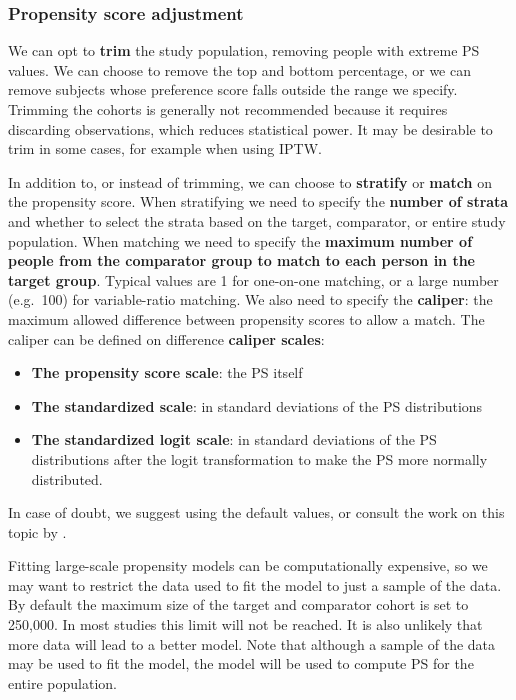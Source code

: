 \documentclass[11pt]{book}
\providecommand{\tightlist}{%
  \setlength{\itemsep}{0pt}\setlength{\parskip}{0pt}}
\theoremstyle{definition}
\theoremstyle{definition}
\theoremstyle{definition}
\theoremstyle{remark}
\begin{document}
\hypertarget{propensity-score-adjustment}{%
\subsubsection*{Propensity score adjustment}\label{propensity-score-adjustment}}

We can opt to \textbf{trim} the study population, removing people with extreme PS values. We can choose to remove the top and bottom percentage, or we can remove subjects whose preference score falls outside the range we specify. Trimming the cohorts is generally not recommended because it requires discarding observations, which reduces statistical power. It may be desirable to trim in some cases, for example when using IPTW. 

In addition to, or instead of trimming, we can choose to \textbf{stratify} or \textbf{match} on the propensity score. When stratifying we need to specify the \textbf{number of strata} and whether to select the strata based on the target, comparator, or entire study population. When matching we need to specify the \textbf{maximum number of people from the comparator group to match to each person in the target group}. Typical values are 1 for one-on-one matching, or a large number (e.g.~100) for variable-ratio matching. We also need to specify the \textbf{caliper}: the maximum allowed difference between propensity scores to allow a match. The caliper can be defined on difference \textbf{caliper scales}: 

\begin{itemize}
\tightlist
\item
  \textbf{The propensity score scale}: the PS itself
\item
  \textbf{The standardized scale}: in standard deviations of the PS distributions
\item
  \textbf{The standardized logit scale}: in standard deviations of the PS distributions after the logit transformation to make the PS more normally distributed.
\end{itemize}

In case of doubt, we suggest using the default values, or consult the work on this topic by \citet{austin_2011}.

Fitting large-scale propensity models can be computationally expensive, so we may want to restrict the data used to fit the model to just a sample of the data. By default the maximum size of the target and comparator cohort is set to 250,000. In most studies this limit will not be reached. It is also unlikely that more data will lead to a better model. Note that although a sample of the data may be used to fit the model, the model will be used to compute PS for the entire population.
\end{document}
